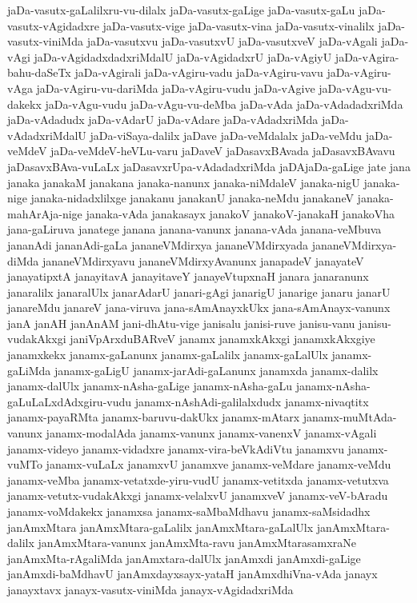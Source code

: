 {jaDa-vasutx-gaLalilxru-vu-dilalx
jaDa-vasutx-gaLige
jaDa-vasutx-gaLu
jaDa-vasutx-vAgidadxre
jaDa-vasutx-vige
jaDa-vasutx-vina
jaDa-vasutx-vinalilx
jaDa-vasutx-viniMda
jaDa-vasutxvu
jaDa-vasutxvU
jaDa-vasutxveV
jaDa-vAgali
jaDa-vAgi
jaDa-vAgidadxdadxriMdalU
jaDa-vAgidadxrU
jaDa-vAgiyU
jaDa-vAgira-bahu-daSeTx
jaDa-vAgirali
jaDa-vAgiru-vadu
jaDa-vAgiru-vavu
jaDa-vAgiru-vAga
jaDa-vAgiru-vu-dariMda
jaDa-vAgiru-vudu
jaDa-vAgive
jaDa-vAgu-vu-dakekx
jaDa-vAgu-vudu
jaDa-vAgu-vu-deMba
jaDa-vAda
jaDa-vAdadadxriMda
jaDa-vAdadudx
jaDa-vAdarU
jaDa-vAdare
jaDa-vAdadxriMda
jaDa-vAdadxriMdalU
jaDa-viSaya-dalilx
jaDave
jaDa-veMdalalx
jaDa-veMdu
jaDa-veMdeV
jaDa-veMdeV-heVLu-varu
jaDaveV
jaDasavxBAvada
jaDasavxBAvavu
jaDasavxBAva-vuLaLx
jaDasavxrUpa-vAdadadxriMda
jaDAjaDa-gaLige
jate
jana
janaka
janakaM
janakana
janaka-nanunx
janaka-niMdaleV
janaka-nigU
janaka-nige
janaka-nidadxlilxge
janakanu
janakanU
janaka-neMdu
janakaneV
janaka-mahArAja-nige
janaka-vAda
janakasayx
janakoV
janakoV-janakaH
janakoVha
jana-gaLiruva
janatege
janana
janana-vanunx
janana-vAda
janana-veMbuva
jananAdi
jananAdi-gaLa
jananeVMdirxya
jananeVMdirxyada
jananeVMdirxya-diMda
jananeVMdirxyavu
jananeVMdirxyAvanunx
janapadeV
janayateV
janayatipxtA
janayitavA
janayitaveY
janayeVtupxnaH
janara
janaranunx
janaralilx
janaralUlx
janarAdarU
janari-gAgi
janarigU
janarige
janaru
janarU
janareMdu
janareV
jana-viruva
jana-sAmAnayxkUkx
jana-sAmAnayx-vanunx
janA
janAH
janAnAM
jani-dhAtu-vige
janisalu
janisi-ruve
janisu-vanu
janisu-vudakAkxgi
janiVpArxduBARveV
janamx
janamxkAkxgi
janamxkAkxgiye
janamxkekx
janamx-gaLanunx
janamx-gaLalilx
janamx-gaLalUlx
janamx-gaLiMda
janamx-gaLigU
janamx-jarAdi-gaLanunx
janamxda
janamx-dalilx
janamx-dalUlx
janamx-nAsha-gaLige
janamx-nAsha-gaLu
janamx-nAsha-gaLuLaLxdAdxgiru-vudu
janamx-nAshAdi-galilalxdudx
janamx-nivaqtitx
janamx-payaRMta
janamx-baruvu-dakUkx
janamx-mAtarx
janamx-muMtAda-vanunx
janamx-modalAda
janamx-vanunx
janamx-vanenxV
janamx-vAgali
janamx-videyo
janamx-vidadxre
janamx-vira-beVkAdiVtu
janamxvu
janamx-vuMTo
janamx-vuLaLx
janamxvU
janamxve
janamx-veMdare
janamx-veMdu
janamx-veMba
janamx-vetatxde-yiru-vudU
janamx-vetitxda
janamx-vetutxva
janamx-vetutx-vudakAkxgi
janamx-velalxvU
janamxveV
janamx-veV-bAradu
janamx-voMdakekx
janamxsa
janamx-saMbaMdhavu
janamx-saMsidadhx
janAmxMtara
janAmxMtara-gaLalilx
janAmxMtara-gaLalUlx
janAmxMtara-dalilx
janAmxMtara-vanunx
janAmxMta-ravu
janAmxMtarasamxraNe
janAmxMta-rAgaliMda
janAmxtara-dalUlx
janAmxdi
janAmxdi-gaLige
janAmxdi-baMdhavU
janAmxdayxsayx-yataH
janAmxdhiVna-vAda
janayx
janayxtavx
janayx-vasutx-viniMda
janayx-vAgidadxriMda
}

